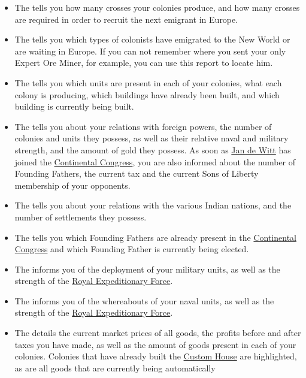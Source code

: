 \documentclass[12pt]{book}
\begin{document}
\begin{itemize}
\item The  tells you how many crosses your
colonies produce, and how many crosses are required in order to
recruit the next emigrant in Europe.
\item The  tells you which types of colonists
have emigrated to the New World or are waiting in Europe. If you can
not remember where you sent your only Expert Ore Miner, for example,
you can use this report to locate him.
\item The  tells you which units are present in
each of your colonies, what each colony is producing, which buildings
have already been built, and which building is currently being built.
\item The  tells you about your
  relations with foreign powers, the number of colonies and units they
  possess, as well as their relative naval and military strength, and
  the amount of gold they possess. As soon as \hyperlink{Jan de
    Witt}{Jan de Witt} has joined the \hyperlink{Continental
    Congress}{Continental Congress}, you are also informed about the
  number of Founding Fathers, the current tax and the current Sons of
  Liberty membership of your opponents.
\item The  tells you about your relations with
the various Indian nations, and the number of settlements they
possess.
\item The  tells you which
Founding Fathers are already present in the \hyperlink{Continental
Congress}{Continental Congress} and which Founding Father is currently
being elected.
\item The  informs you of the deployment of
your military units, as well as the strength of the \hyperlink{Royal
Expeditionary Force}{Royal Expeditionary Force}.
\item The  informs you of the whereabouts of
your naval units, as well as the strength of the \hyperlink{Royal
Expeditionary Force}{Royal Expeditionary Force}.
\item The  details the current market prices of
all goods, the profits before and after taxes you have made, as well
as the amount of goods present in each of your colonies. Colonies that
have already built the \hyperlink{Custom House}{Custom House} are
highlighted, as are all goods that are currently being automatically

\end{itemize}
\end{document}
